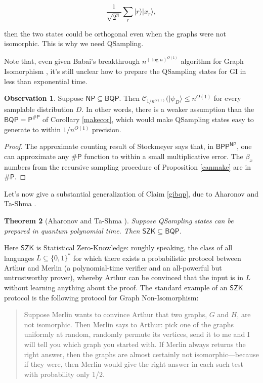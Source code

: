 \documentclass[12pt]{report}
\theoremstyle{plain}
\newtheorem{theorem}{Theorem}[section]
\theoremstyle{definition}
\newtheorem{observation}[theorem]{Observation}
\renewcommand{\ket}[1]{|#1\rangle}
\begin{document}
$$\frac{1}{\sqrt{2^n}} \sum_r \ket{r} \ket{x_r},$$

\noindent then the two states could be orthogonal even when the graphs were not isomorphic.  This is why we need QSampling.

Note that, even given Babai's breakthrough $n^{(\log n)^{O(1)}}$ algorithm for Graph Isomorphism \cite{Babai16}, it's still unclear how to prepare the QSampling states for GI in less than exponential time.

\begin{observation}
Suppose $\mathsf{NP} \subseteq \mathsf{BQP}$.  Then $\mathcal{C}_{1/n^{O(1)}} (\ket{\psi_D}\leq n^{O(1)}$ for every samplable distribution $D$.  In other words, there is a weaker assumption than the $\mathsf{BQP} = \mathsf{P^{\#P}}$ of Corollary \ref{makecor}, which would make QSampling states easy to generate to within $1/n^{O(1)}$ precision.
\end{observation}
\begin{proof}
The approximate counting result of Stockmeyer \cite{DBLP:conf/stoc/Stockmeyer83} says that, in $\mathsf{BPP^{NP}}$, one can approximate any $\#\mathsf{P}$ function to within a small multiplicative error. The $\beta_x$ numbers from the recursive sampling procedure of Proposition \ref{canmake} are in $\#\mathsf{P}$.
\end{proof}

Let's now give a substantial generalization of Claim \ref{gibqp}, due to Aharonov and Ta-Shma \cite{at}.

\begin{theorem}[Aharonov and Ta-Shma \cite{at}]\label{ATS}
Suppose QSampling states can be prepared in quantum polynomial time.  Then $\mathsf{SZK} \subseteq \mathsf{BQP}$.
\end{theorem}

Here $\mathsf{SZK}$ is Statistical Zero-Knowledge: roughly speaking, the class of all languages $L\subseteq \{0,1\}^*$ for which there exists a probabilistic protocol between Arthur and Merlin (a polynomial-time verifier and an all-powerful but untrustworthy prover), whereby Arthur can be convinced that the input is in $L$ without learning anything about the proof.  The standard example of an $\mathsf{SZK}$ protocol is the following protocol for Graph Non-Isomorphism:
\begin{quote}
Suppose Merlin wants to convince Arthur that two graphs, $G$ and $H$, are not isomorphic.  Then Merlin says to Arthur: pick one of the graphs uniformly at random, randomly permute its vertices, send it to me and I will tell you which graph you started with. If Merlin always returns the right answer, then the graphs are almost certainly not isomorphic---because if they were, then Merlin would give the right answer in each such test with probability only 1/2.
\end{quote}
\end{document}
